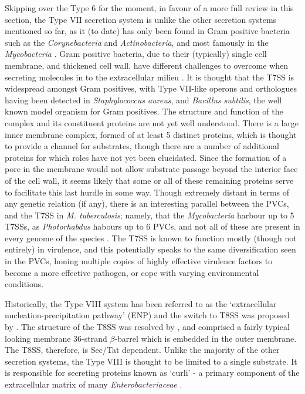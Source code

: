 Skipping over the Type 6 for the moment, in favour of a more full review in this section, the Type VII secretion system is unlike the other secretion systems mentioned so far, as it (to date) has only been found in Gram positive bacteria such as the \emph{Corynebacteria} and \emph{Actinobacteria}, and most famously in the \emph{Mycobacteria} \citep{Ates2016}. Gram positive bacteria, due to their (typically) single cell membrane, and thickened cell wall, have different challenges to overcome when secreting molecules in to the extracellular milieu \citep{Green2015}. It is thought that the T7SS is widespread amongst Gram positives, with Type VII-like operons and orthologues having been detected in \emph{Staphylococcus aureus}, and \emph{Bacillus subtilis}, the well known model organism for Gram positives. The structure and function of the complex and its constituent proteins are not yet well understood. There is a large inner membrane complex, formed of at least 5 distinct proteins, which is thought to provide a channel for substrates, though there are a number of additional proteins for which roles have not yet been elucidated. Since the formation of a pore in the membrane would not allow substrate passage beyond the interior face of the cell wall, it seems likely that some or all of these remaining proteins serve to facilitate this last hurdle in some way. Though extremely distant in terms of any genetic relation (if any), there is an interesting parallel between the PVCs, and the T7SS in \emph{M. tuberculosis}; namely, that the \emph{Mycobacteria} harbour up to 5 T7SSs, as \emph{Photorhabdus} habours up to 6 PVCs, and not all of these are present in every genome of the species \citep{Bottai2017}. The T7SS is known to function mostly (though not entirely) in virulence, and this potentially speaks to the same diversification seen in the PVCs, honing multiple copies of highly effective virulence factors to become a more effective pathogen, or cope with varying environmental conditions.

Historically, the Type VIII system has been referred to as the `extracellular nucleation-precipitation pathway' (ENP) and the switch to T8SS was proposed by \cite{Desvaux2009}. The structure of the T8SS was resolved by \cite{Goyal2014}, and comprised a fairly typical looking membrane 36-strand $\beta$-barrel which is embedded in the outer membrane. The T8SS, therefore, is Sec/Tat dependent. Unlike the majority of the other secretion systems, the Type VIII is thought to be limited to a single substrate. It is responsible for secreting proteins known as `curli' - a primary component of the extracellular matrix of many \emph{Enterobacteriaceae} \citep{Barnhart2010}.

